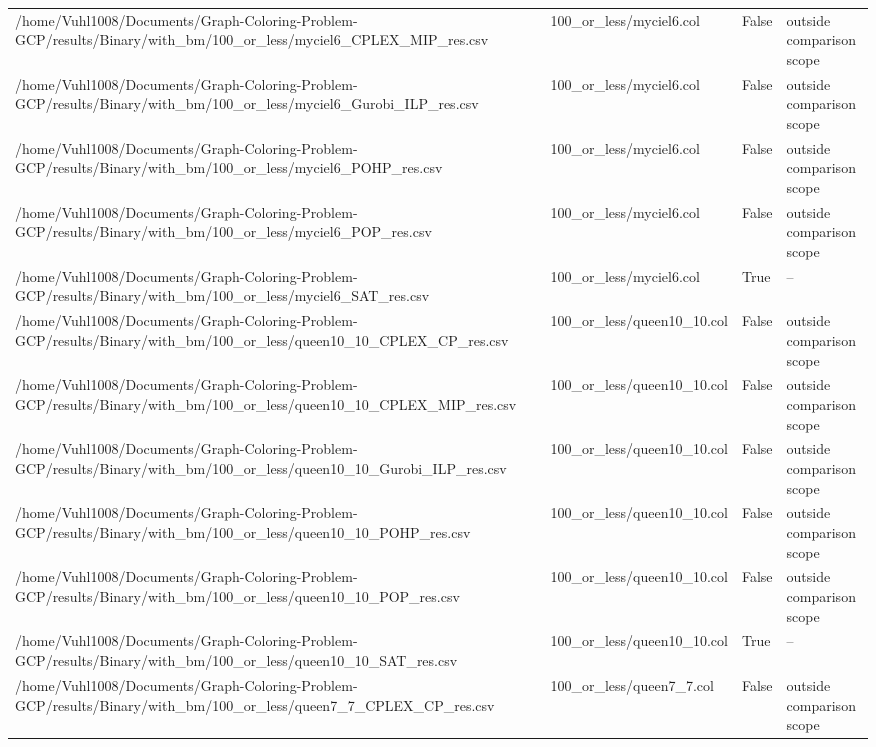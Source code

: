\begin{table}[htbp]
\begin{tabular}{llll}
/home/Vuhl1008/Documents/Graph-Coloring-Problem-GCP/results/Binary/with\_bm/100\_or\_less/myciel6\_CPLEX\_MIP\_res.csv & 100\_or\_less/myciel6.col & False & outside comparison scope \\
/home/Vuhl1008/Documents/Graph-Coloring-Problem-GCP/results/Binary/with\_bm/100\_or\_less/myciel6\_Gurobi\_ILP\_res.csv & 100\_or\_less/myciel6.col & False & outside comparison scope \\
/home/Vuhl1008/Documents/Graph-Coloring-Problem-GCP/results/Binary/with\_bm/100\_or\_less/myciel6\_POHP\_res.csv & 100\_or\_less/myciel6.col & False & outside comparison scope \\
/home/Vuhl1008/Documents/Graph-Coloring-Problem-GCP/results/Binary/with\_bm/100\_or\_less/myciel6\_POP\_res.csv & 100\_or\_less/myciel6.col & False & outside comparison scope \\
/home/Vuhl1008/Documents/Graph-Coloring-Problem-GCP/results/Binary/with\_bm/100\_or\_less/myciel6\_SAT\_res.csv & 100\_or\_less/myciel6.col & True & -- \\
/home/Vuhl1008/Documents/Graph-Coloring-Problem-GCP/results/Binary/with\_bm/100\_or\_less/queen10\_10\_CPLEX\_CP\_res.csv & 100\_or\_less/queen10\_10.col & False & outside comparison scope \\
/home/Vuhl1008/Documents/Graph-Coloring-Problem-GCP/results/Binary/with\_bm/100\_or\_less/queen10\_10\_CPLEX\_MIP\_res.csv & 100\_or\_less/queen10\_10.col & False & outside comparison scope \\
/home/Vuhl1008/Documents/Graph-Coloring-Problem-GCP/results/Binary/with\_bm/100\_or\_less/queen10\_10\_Gurobi\_ILP\_res.csv & 100\_or\_less/queen10\_10.col & False & outside comparison scope \\
/home/Vuhl1008/Documents/Graph-Coloring-Problem-GCP/results/Binary/with\_bm/100\_or\_less/queen10\_10\_POHP\_res.csv & 100\_or\_less/queen10\_10.col & False & outside comparison scope \\
/home/Vuhl1008/Documents/Graph-Coloring-Problem-GCP/results/Binary/with\_bm/100\_or\_less/queen10\_10\_POP\_res.csv & 100\_or\_less/queen10\_10.col & False & outside comparison scope \\
/home/Vuhl1008/Documents/Graph-Coloring-Problem-GCP/results/Binary/with\_bm/100\_or\_less/queen10\_10\_SAT\_res.csv & 100\_or\_less/queen10\_10.col & True & -- \\
/home/Vuhl1008/Documents/Graph-Coloring-Problem-GCP/results/Binary/with\_bm/100\_or\_less/queen7\_7\_CPLEX\_CP\_res.csv & 100\_or\_less/queen7\_7.col & False & outside comparison scope \\

\end{tabular}
\end{table}
